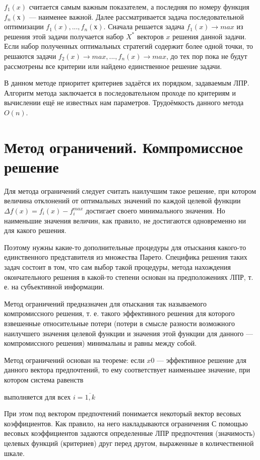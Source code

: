 \documentclass[a4paper,14pt]{report}
\begin{document}
$f_1(x)$ считается самым важным показателем, а последняя по номеру функция $f_n(х)$ — наименее важной. Далее рассматривается задача последовательной оптимизации $f_1(x), ..., f_n(х)$. Сначала решается задача $f_1(x) \rightarrow max$ из решения этой задачи получается набор $X^*$ векторов $x$ решения данной задачи. Если набор полученных оптимальных стратегий содержит более одной точки, то решаются задачи $f_2(x) \rightarrow max, ... , f_n(x) \rightarrow max$, до тех пор пока не будут рассмотрены все критерии или найдено единственное решение задачи.

В данном методе приоритет критериев задаётся их порядком, задаваемым ЛПР. Алгоритм метода заключается в последовательном проходе по критериям и вычислении ещё не известных нам параметров. Трудоёмкость данного метода $O(n)$. 



\section{Метод ограничений. Компромиссное решение}


Для метода ограничений следует считать наилучшим такое решение, при котором величина отклонений от оптимальных значений по каждой целевой функции $\Delta{f(x)} = f_i(x) - f_i^{max}$ достигает своего минимального значения. Но наименьшие значения величин, как правило, не достигаются одновременно ни для какого решения.

Поэтому нужны какие-то дополнительные процедуры для отыскания какого-то единственного представителя из множества Парето.  Специфика решения таких задач состоит в том, что сам выбор такой процедуры, метода нахождения окончательного решения в какой-то степени основан на предположениях ЛПР, т. е. на субъективной информации.

Метод ограничений предназначен для отыскания так называемого компромиссного решения, т. е. такого эффективного решения для которого взвешенные относительные потери (потери в смысле разности возможного наилучшего значения целевой функции и значения этой функции для данного --- компромиссного решения) минимальны и равны между собой. 

Метод ограничений основан на теореме: если $x0$ --- эффективное решение для данного вектора предпочтений, то ему соответствует наименьшее значение, при котором система равенств

 выполняется для всех $i = \overline{1,k}$      

При этом под вектором предпочтений понимается некоторый вектор весовых коэффициентов.  Как правило, на него накладываются ограничения С помощью весовых коэффициентов задаются определенные ЛПР предпочтения (значимость) целевых функций (критериев) друг перед другом, выраженные в количественной шкале.
\end{document}
